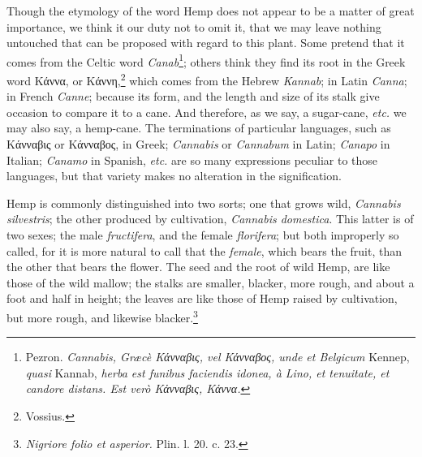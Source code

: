 \documentclass[a4paper, 11pt, oneside, polutonikogreek, english]{article}
\begin{document}
Though the etymology of the word Hemp does not appear to be a matter of great importance, we think it our duty not to omit it, that we may leave nothing untouched that can be proposed with regard to this plant. Some pretend that it comes from the Celtic word \emph{Canab}\footnote{Pezron. \emph{Cannabis, Græcè Κάνναβις, vel Κάνναβος, unde et Belgicum} Kennep, \emph{quasi} Kannab, \emph{herba est funibus faciendis idonea, à Lino, et tenuitate, et candore distans. Est verò Κάνναβις, Κάννα.}}; others think they find its root in the Greek word Κάννα, or Κάννη,\footnote{Vossius.} which comes from the Hebrew \emph{Kannab}; in Latin \emph{Canna}; in French \emph{Canne}; because its form, and the length and size of its stalk give occasion to compare it to a cane. And therefore, as we say, a sugar-cane, \emph{etc.} we may also say, a hemp-cane. The terminations of particular languages, such as Κάνναβις or Κάνναβος, in Greek; \emph{Cannabis} or \emph{Cannabum} in Latin; \emph{Canapo} in Italian; \emph{Canamo} in Spanish, \emph{etc.} are so many expressions peculiar to those languages, but that variety makes no alteration in the signification.

Hemp is commonly distinguished into two sorts; one that grows wild, \emph{Cannabis silvestris}; the other produced by cultivation, \emph{Cannabis domestica}. This latter is of two sexes; the male \emph{fructifera}, and the female \emph{florifera}; but both improperly so called, for it is more natural to call that the \emph{female}, which bears the fruit, than the other that bears the flower. The seed and the root of wild Hemp, are like those of the wild mallow; the stalks are smaller, blacker, more rough, and about a foot and half in height; the leaves are like those of Hemp raised by cultivation, but more rough, and likewise blacker.\footnote{\emph{Nigriore folio et asperior.} Plin. l. 20. c. 23.}
\end{document}
